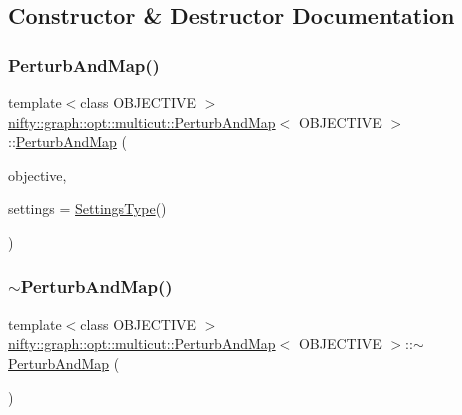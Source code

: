 \subsection{Constructor \& Destructor Documentation}
\mbox{\label{classnifty_1_1graph_1_1opt_1_1multicut_1_1PerturbAndMap_a20299dc0f4de9c1dafe0db8f510ba52a}} 
\subsubsection{\texorpdfstring{Perturb\+And\+Map()}{PerturbAndMap()}}
{\footnotesize\ttfamily template$<$class O\+B\+J\+E\+C\+T\+I\+VE $>$ \\
\hyperlink{classnifty_1_1graph_1_1opt_1_1multicut_1_1PerturbAndMap}{nifty\+::graph\+::opt\+::multicut\+::\+Perturb\+And\+Map}$<$ O\+B\+J\+E\+C\+T\+I\+VE $>$\+::\hyperlink{classnifty_1_1graph_1_1opt_1_1multicut_1_1PerturbAndMap}{Perturb\+And\+Map} (\begin{DoxyParamCaption}\item[{const \hyperlink{classnifty_1_1graph_1_1opt_1_1multicut_1_1PerturbAndMap_ac76585ed44501350bf31fbcc2d02078e}{Objective\+Type} \&}]{objective,  }\item[{const \hyperlink{structnifty_1_1graph_1_1opt_1_1multicut_1_1PerturbAndMap_1_1SettingsType}{Settings\+Type}}]{settings = {\ttfamily \hyperlink{structnifty_1_1graph_1_1opt_1_1multicut_1_1PerturbAndMap_1_1SettingsType}{Settings\+Type}()} }\end{DoxyParamCaption})}

\mbox{\label{classnifty_1_1graph_1_1opt_1_1multicut_1_1PerturbAndMap_a7732d789858c6f4c1f31f5da7f5525e5}} 
\subsubsection{\texorpdfstring{$\sim$\+Perturb\+And\+Map()}{~PerturbAndMap()}}
{\footnotesize\ttfamily template$<$class O\+B\+J\+E\+C\+T\+I\+VE $>$ \\
\hyperlink{classnifty_1_1graph_1_1opt_1_1multicut_1_1PerturbAndMap}{nifty\+::graph\+::opt\+::multicut\+::\+Perturb\+And\+Map}$<$ O\+B\+J\+E\+C\+T\+I\+VE $>$\+::$\sim$\hyperlink{classnifty_1_1graph_1_1opt_1_1multicut_1_1PerturbAndMap}{Perturb\+And\+Map} (\begin{DoxyParamCaption}{ }\end{DoxyParamCaption})}



